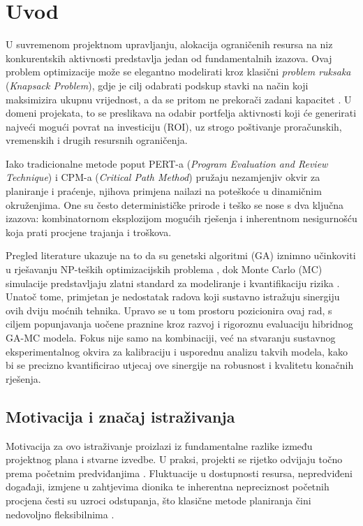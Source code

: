 \section{Uvod}
\label{chap:uvod}


U suvremenom projektnom upravljanju, alokacija ograničenih resursa na niz konkurentskih aktivnosti predstavlja jedan od fundamentalnih izazova. Ovaj problem optimizacije može se elegantno modelirati kroz klasični \textit{problem ruksaka} (\textit{Knapsack Problem}), gdje je cilj odabrati podskup stavki na način koji maksimizira ukupnu vrijednost, a da se pritom ne prekorači zadani kapacitet \cite{Kellerer2004}. U domeni projekata, to se preslikava na odabir portfelja aktivnosti koji će generirati najveći mogući povrat na investiciju (ROI), uz strogo poštivanje proračunskih, vremenskih i drugih resursnih ograničenja.

Iako tradicionalne metode poput PERT-a (\textit{Program Evaluation and Review Technique}) i CPM-a (\textit{Critical Path Method}) \cite{Malcolm1959,Kerzner2017} pružaju nezamjenjiv okvir za planiranje i praćenje, njihova primjena nailazi na poteškoće u dinamičnim okruženjima. One su često determinističke prirode i teško se nose s dva ključna izazova: kombinatornom eksplozijom mogućih rješenja i inherentnom nesigurnošću koja prati procjene trajanja i troškova.

Pregled literature ukazuje na to da su genetski algoritmi (GA) iznimno učinkoviti u rješavanju NP-teških optimizacijskih problema \cite{Holland1975,Goldberg1989}, dok Monte Carlo (MC) simulacije predstavljaju zlatni standard za modeliranje i kvantifikaciju rizika \cite{Metropolis1949,Rubinstein2016}. Unatoč tome, primjetan je nedostatak radova koji sustavno istražuju sinergiju ovih dviju moćnih tehnika. Upravo se u tom prostoru pozicionira ovaj rad, s ciljem popunjavanja uočene praznine kroz razvoj i rigoroznu evaluaciju hibridnog GA-MC modela. Fokus nije samo na kombinaciji, već na stvaranju sustavnog eksperimentalnog okvira za kalibraciju i usporednu analizu takvih modela, kako bi se precizno kvantificirao utjecaj ove sinergije na robusnost i kvalitetu konačnih rješenja.

\subsection{Motivacija i značaj istraživanja}

Motivacija za ovo istraživanje proizlazi iz fundamentalne razlike između projektnog plana i stvarne izvedbe. U praksi, projekti se rijetko odvijaju točno prema početnim predviđanjima \cite{Kerzner2017}. Fluktuacije u dostupnosti resursa, nepredviđeni događaji, izmjene u zahtjevima dionika te inherentna nepreciznost početnih procjena česti su uzroci odstupanja, što klasične metode planiranja čini nedovoljno fleksibilnima \cite{PMI2021}.


